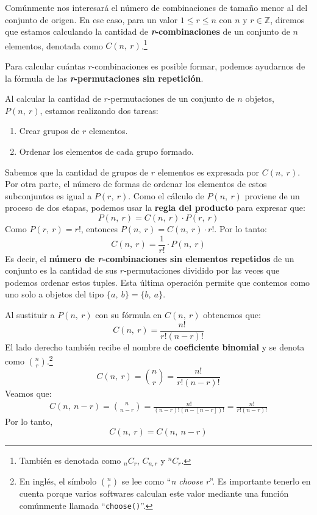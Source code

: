 \documentclass[12pt]{article}
\begin{document}
Comúnmente nos interesará el número de combinaciones de tamaño menor al del conjunto de origen. En ese caso, para un valor $1 \leq r \leq n$ con $n$ y $r \in \mathbb{Z}$, diremos que estamos calculando la cantidad de \textbf{\textit{r}-combinaciones} de un conjunto de $n$ elementos, denotada como $C(n, \ r)$.\footnote{También es denotada como ${}_{n}C_{r}$, $C_{n,r}$ y ${}^{n}C_{r}$.}

Para calcular cuántas $r$-combinaciones es posible formar, podemos ayudarnos de la fórmula de las \textbf{\textit{r}-permutaciones sin repetición}.

Al calcular la cantidad de $r$-permutaciones de un conjunto de $n$ objetos, $P(n, \ r)$, estamos realizando dos tareas:

\begin{enumerate}
\item Crear grupos de $r$ elementos.
\item Ordenar los elementos de cada grupo formado.
\end{enumerate}

Sabemos que la cantidad de grupos de $r$ elementos es expresada por $C(n, \ r)$. Por otra parte, el número de formas de ordenar los elementos de estos subconjuntos es igual a $P(r, \ r)$. Como el cálculo de $P(n, \ r)$ proviene de un proceso de dos etapas, podemos usar la \textbf{regla del producto} para expresar que:
\[
  P(n, \ r) = C(n, \ r) \cdot P(r, \ r)
\]
Como $P(r, \ r) = r!$, entonces $P(n, \ r) = C(n, \ r) \cdot r!$. Por lo tanto:
\[
  C(n, \ r) = \frac{1}{r!} \cdot P(n, \ r)
\]
Es decir, el \textbf{número de \textit{r}-combinaciones sin elementos repetidos} de un conjunto es la cantidad de sus $r$-permutaciones dividido por las veces que podemos ordenar estos tuples. Esta última operación permite que contemos como uno solo a objetos del tipo $\{a, \ b\} = \{b, \ a\}$.

Al sustituir a $P(n, \ r)$ con su fórmula en $C(n, \ r)$ obtenemos que:
\[
  C(n, \ r) = \frac{n!}{r! (n - r)!}
\]
El lado derecho también recibe el nombre de \textbf{coeficiente binomial} y se denota como $\binom{n}{r}$.\footnote{En inglés, el símbolo $\binom{n}{r}$ se lee como ``\textit{n choose r}''. Es importante tenerlo en cuenta porque varios softwares calculan este valor mediante una función comúnmente llamada ``\texttt{choose()}''.}
\[
  C(n, \ r) = \binom{n}{r} = \frac{n!}{r! (n - r)!}
\]
Veamos que:
\begin{align*}
C(n, \ n - r) = \binom{n}{n - r}
              = \frac{n!}{(n - r)! (n - [n - r])!}
              = \frac{n!}{r!(n - r)!}
\end{align*}
Por lo tanto,
\[
  C(n, \ r) = C(n, \ n - r)
\]
\end{document}
